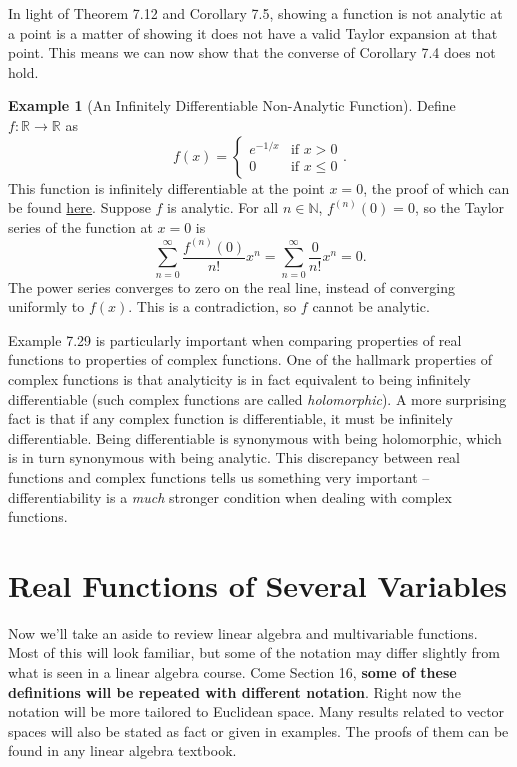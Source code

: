 \documentclass{article}
\newcommand{\N}{\mathbb{N}}
\newcommand{\R}{\mathbb{R}}
\theoremstyle{definition}
\newtheorem{example}{Example}[section]
\begin{document}
	In light of Theorem 7.12 and Corollary 7.5, showing a function is not analytic at a point is a matter of showing it does not have a valid Taylor expansion at that point. This means we can now show that the converse of Corollary 7.4 does not hold.
	\begin{example}[An Infinitely Differentiable Non-Analytic Function]
		Define $ f:\R\to\R $ as $$ f(x) =\begin{cases}
			e^{-1/x} &\text{if }x>0\\
			0&\text{if } x\le 0
		\end{cases}. $$
		This function is infinitely differentiable at the point $ x = 0 $, the proof of which can be found \href{https://en.wikipedia.org/wiki/Non-analytic_smooth_function}{here}. Suppose $ f $ is analytic. For all $ n\in \N $, $ f^{(n)}(0)=0 $, so the Taylor series of the function at $ x = 0 $ is 
		$$ \sum_{n=0}^{\infty}\frac{f^{(n)}(0)}{n!}x^n = \sum_{n=0}^{\infty}\frac{0}{n!}x^n = 0.$$
		The power series converges to zero on the real line, instead of converging uniformly to $ f(x) $. This is a contradiction, so $ f $ cannot be analytic.
	\end{example}
	
	Example 7.29 is particularly important when comparing properties of real functions to properties of complex functions. One of the hallmark properties of complex functions is that analyticity is in fact equivalent to being infinitely differentiable (such complex functions are called \textit{\color{red}holomorphic}). A more surprising fact is that if any complex function is differentiable, it must be infinitely differentiable. Being differentiable is synonymous with being holomorphic, which is in turn synonymous with being analytic. This discrepancy between real functions and complex functions tells us something very important -- differentiability is a \textit{much} stronger condition when dealing with complex functions. 
	\section{Real Functions of Several Variables}
	Now we'll take an aside to review linear algebra and multivariable functions. Most of this will look familiar, but some of the notation may differ slightly from what is seen in a linear algebra course. Come Section 16, \textbf{some of these definitions will be repeated with different notation}. Right now the notation will be more tailored to Euclidean space. Many results related to vector spaces will also be stated as fact or given in examples. The proofs of them can be found in any linear algebra textbook. 
\end{document}
